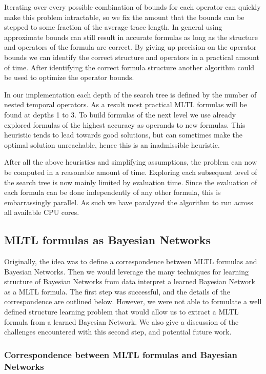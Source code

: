 \documentclass[runningheads]{llncs}
\begin{document}
Iterating over every possible combination of bounds for each operator can quickly make this problem intractable, so we fix the amount that the bounds can be stepped to some fraction of the average trace length. In general using approximate bounds can still result in accurate formulas as long as the structure and operators of the formula are correct. By giving up precision on the operator bounds we can identify the correct structure and operators in a practical amount of time. After identifying the correct formula structure another algorithm could be used to optimize the operator bounds.

In our implementation each depth of the search tree is defined by the number of nested temporal operators. As a result most practical MLTL formulas will be found at depths 1 to 3. To build formulas of the next level we use already explored formulas of the highest accuracy as operands to new formulas. This heuristic tends to lead towards good solutions, but can sometimes make the optimal solution unreachable, hence this is an inadmissible heuristic.

After all the above heuristics and simplifying assumptions, the problem can now be computed in a reasonable amount of time. Exploring each subsequent level of the search tree is now mainly limited by evaluation time. Since the evaluation of each formula can be done independently of any other formula, this is embarrassingly parallel. As such we have paralyzed the algorithm to run across all available CPU cores.

\subsection{MLTL formulas as Bayesian Networks}

Originally, the idea was to define a correspondence between MLTL formulas and Bayesian Networks. 
Then we would leverage the many techniques for learning structure of Bayesian Networks from data interpret a learned Bayesian Network as a MLTL formula. 
The first step was successful, and the details of the correspondence are outlined below.
However, we were not able to formulate a well defined structure learning problem that would allow us to extract a MLTL formula from a learned Bayesian Network. 
We also give a discussion of the challenges encountered with this second step, and potential future work.

\subsubsection{Correspondence between MLTL formulas and Bayesian Networks}
\end{document}
